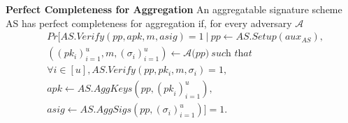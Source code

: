 
\vspace{-0.02in}
\noindent \textbf{Perfect Completeness for Aggregation} An aggregatable 
signature scheme AS
has perfect completeness for aggregation if, for every adversary $\mathcal{A}$
\begin{align*}
& \mathit{Pr}[\mathit{AS.Verify}(\mathit{pp}, \mathit{apk}, m, \mathit{asig}) = 1 \ | \ \mathit{pp} \leftarrow \mathit{AS.Setup}(\mathit{aux_{\mathit{AS}}}), \\
& ((\mathit{pk_i})_{i=1}^u, m, (\sigma_i)_{i=1}^{u}) \leftarrow \mathcal{A}(\mathit{\mathit{pp})} \ 
\textit{such that} \\ 
&\forall i \in [u], \mathit{AS.Verify}(\mathit{pp}, \mathit{pk_i}, m, \sigma_i) = 1, \\
& \mathit{apk} \leftarrow \mathit{AS.AggKeys}(\mathit{pp},  (\mathit{pk}_{i})_{i=1}^{u}), \\
&  \mathit{asig} \leftarrow \mathit{AS.AggSigs}(\mathit{pp}, (\sigma_i)_{i=1}^u)] = 1.
\end{align*}

